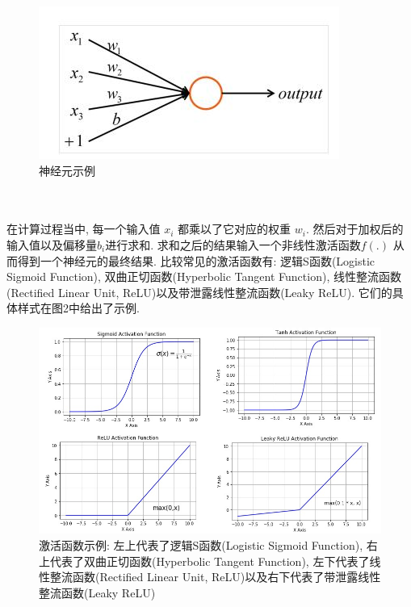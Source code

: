 \documentclass[12pt]{article}
\begin{document}
\begin{CJK*}{UTF8}{gbsn}
\begin{figure}[ht]
\centering
\includegraphics[width=.5\textwidth]{figure1.jpg}
\caption{神经元示例}
\label{fig:fig1}
\end{figure}
\\
\\
在计算过程当中,     每一个输入值 $x_i$ 都乘以了它对应的权重 $w_i$. 然后对于加权后的输入值以及偏移量$b_i$进行求和. 求和之后的结果输入一个非线性激活函数$f(.)$ 从而得到一个神经元的最终结果. 比较常见的激活函数有: 逻辑S函数(Logistic Sigmoid Function),     双曲正切函数(Hyperbolic Tangent Function),    线性整流函数(Rectified Linear Unit,     ReLU)以及带泄露线性整流函数(Leaky ReLU). 它们的具体样式在图2中给出了示例.


\begin{figure}[H]
\centering
\includegraphics[width=1\textwidth]{activation.jpg}
\caption{激活函数示例: 左上代表了逻辑S函数(Logistic Sigmoid Function),    右上代表了双曲正切函数(Hyperbolic Tangent Function),    左下代表了线性整流函数(Rectified Linear Unit,    ReLU)以及右下代表了带泄露线性整流函数(Leaky ReLU)}
\label{fig:fig1}
\end{figure}


\end{CJK*}
\end{document}
